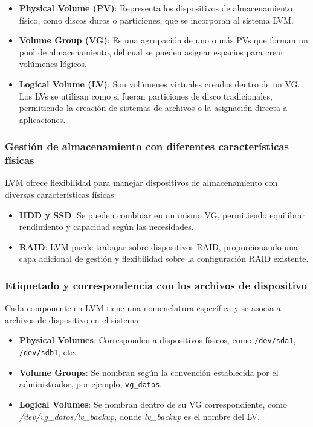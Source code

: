 \begin{itemize}
  \item \textbf{Physical Volume (PV)}: Representa los dispositivos de almacenamiento físico, como discos duros o particiones, que se incorporan al sistema LVM.
  \item \textbf{Volume Group (VG)}: Es una agrupación de uno o más PVs que forman un pool de almacenamiento, del cual se pueden asignar espacios para crear volúmenes lógicos.
  \item \textbf{Logical Volume (LV)}: Son volúmenes virtuales creados dentro de un VG. Los LVs se utilizan como si fueran particiones de disco tradicionales, permitiendo la creación de sistemas de archivos o la asignación directa a aplicaciones.
\end{itemize}

\subsubsection{Gestión de almacenamiento con diferentes características físicas}

LVM ofrece flexibilidad para manejar dispositivos de almacenamiento con diversas características físicas:

\begin{itemize}
  \item \textbf{HDD y SSD}: Se pueden combinar en un mismo VG, permitiendo equilibrar rendimiento y capacidad según las necesidades.
  \item \textbf{RAID}: LVM puede trabajar sobre dispositivos RAID, proporcionando una capa adicional de gestión y flexibilidad sobre la configuración RAID existente.
\end{itemize}

\subsubsection{Etiquetado y correspondencia con los archivos de dispositivo}

Cada componente en LVM tiene una nomenclatura específica y se asocia a archivos de dispositivo en el sistema:

\begin{itemize}
  \item \textbf{Physical Volumes}: Corresponden a dispositivos físicos, como \texttt{/dev/sda1}, \texttt{/dev/sdb1}, etc.
  \item \textbf{Volume Groups}: Se nombran según la convención establecida por el administrador, por ejemplo, \texttt{vg\_datos}.
  \item \textbf{Logical Volumes}: Se nombran dentro de su VG correspondiente, como \textit{/dev/vg\_datos/lv\_backup}, donde \textit{lv\_backup} es el nombre del LV.
\end{itemize}

